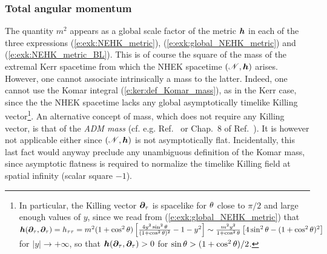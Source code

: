\subsubsection{Total angular momentum}

The quantity $m^2$ appears as a global scale factor of the metric $\bm{h}$ in
each of the three expressions (\ref{e:exk:NEHK_metric}), (\ref{e:exk:global_NEHK_metric})
and (\ref{e:exk:NEHK_metric_BL}). This is of course the square of the mass of the extremal
Kerr spacetime from which the NHEK spacetime $(\mathscr{N},\bm{h})$ arises. However, one cannot
associate intrinsically a mass to the latter. Indeed, one cannot use the
Komar integral
(\ref{e:ker:def_Komar_mass}), as in the Kerr case, since the
the NHEK spacetime lacks any
global asymptotically timelike Killing vector\footnote{In particular, the Killing vector
$\bm{\partial}_\tau$ is spacelike for $\theta$ close to $\pi/2$ and large enough values of $y$, since
we read from (\ref{e:exk:global_NEHK_metric}) that
$\bm{h}(\bm{\partial}_\tau, \bm{\partial}_\tau) = h_{\tau\tau} = m^2 (1 + \cos^2\theta)
\left[ \frac{4 y^2 \sin^2\theta}{(1 + \cos^2\theta)^2} - 1 - y^2 \right]
\sim \frac{m^2 y^2}{1 + \cos^2\theta} \left[ 4 \sin^2\theta - (1 + \cos^2\theta)^2 \right]$
for $|y|\to +\infty$, so that $\bm{h}(\bm{\partial}_\tau, \bm{\partial}_\tau) > 0$ for
$\sin\theta > (1 + \cos^2\theta)/2$.}.
An alternative concept of mass, which does not require any Killing vector,
is that of the \emph{ADM mass} (cf. e.g.
Ref.~\cite{JaramG11} or
Chap.~8 of Ref.~\cite{Gourg12}). It is however not applicable either since
$(\mathscr{N},\bm{h})$ is not asymptotically flat. Incidentally, this last fact would
anyway preclude any unambiguous definition of the Komar mass, since asymptotic flatness
is required to normalize the timelike Killing field  at spatial
infinity (scalar square $-1$).

